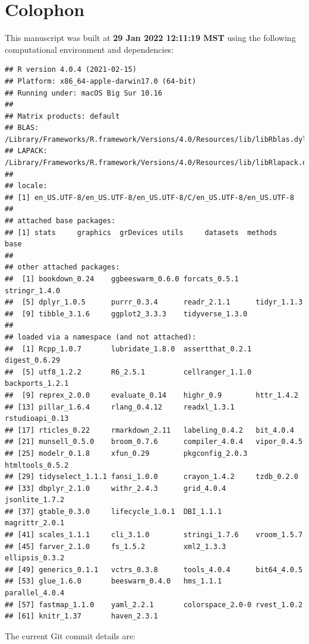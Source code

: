 \documentclass[smallextended]{svjour3}       %
\begin{document}
\hypertarget{colophon}{%
\section{Colophon}\label{colophon}}

This manuscript was built at \textbf{29 Jan 2022 12:11:19 MST} using the following computational environment and dependencies:

\begin{verbatim}
## R version 4.0.4 (2021-02-15)
## Platform: x86_64-apple-darwin17.0 (64-bit)
## Running under: macOS Big Sur 10.16
## 
## Matrix products: default
## BLAS:   /Library/Frameworks/R.framework/Versions/4.0/Resources/lib/libRblas.dylib
## LAPACK: /Library/Frameworks/R.framework/Versions/4.0/Resources/lib/libRlapack.dylib
## 
## locale:
## [1] en_US.UTF-8/en_US.UTF-8/en_US.UTF-8/C/en_US.UTF-8/en_US.UTF-8
## 
## attached base packages:
## [1] stats     graphics  grDevices utils     datasets  methods   base     
## 
## other attached packages:
##  [1] bookdown_0.24    ggbeeswarm_0.6.0 forcats_0.5.1    stringr_1.4.0   
##  [5] dplyr_1.0.5      purrr_0.3.4      readr_2.1.1      tidyr_1.1.3     
##  [9] tibble_3.1.6     ggplot2_3.3.3    tidyverse_1.3.0 
## 
## loaded via a namespace (and not attached):
##  [1] Rcpp_1.0.7       lubridate_1.8.0  assertthat_0.2.1 digest_0.6.29   
##  [5] utf8_1.2.2       R6_2.5.1         cellranger_1.1.0 backports_1.2.1 
##  [9] reprex_2.0.0     evaluate_0.14    highr_0.9        httr_1.4.2      
## [13] pillar_1.6.4     rlang_0.4.12     readxl_1.3.1     rstudioapi_0.13 
## [17] rticles_0.22     rmarkdown_2.11   labeling_0.4.2   bit_4.0.4       
## [21] munsell_0.5.0    broom_0.7.6      compiler_4.0.4   vipor_0.4.5     
## [25] modelr_0.1.8     xfun_0.29        pkgconfig_2.0.3  htmltools_0.5.2 
## [29] tidyselect_1.1.1 fansi_1.0.0      crayon_1.4.2     tzdb_0.2.0      
## [33] dbplyr_2.1.0     withr_2.4.3      grid_4.0.4       jsonlite_1.7.2  
## [37] gtable_0.3.0     lifecycle_1.0.1  DBI_1.1.1        magrittr_2.0.1  
## [41] scales_1.1.1     cli_3.1.0        stringi_1.7.6    vroom_1.5.7     
## [45] farver_2.1.0     fs_1.5.2         xml2_1.3.3       ellipsis_0.3.2  
## [49] generics_0.1.1   vctrs_0.3.8      tools_4.0.4      bit64_4.0.5     
## [53] glue_1.6.0       beeswarm_0.4.0   hms_1.1.1        parallel_4.0.4  
## [57] fastmap_1.1.0    yaml_2.2.1       colorspace_2.0-0 rvest_1.0.2     
## [61] knitr_1.37       haven_2.3.1
\end{verbatim}

The current Git commit details are:
\end{document}
